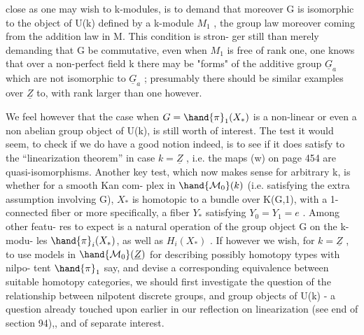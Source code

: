 
close as one may wish to k-modules,  is to demand that moreover G is
isomorphic to the object of U(k) defined by a k-module $M_1$ ,  the group
law moreover coming from the addition law in M.  This condition is stron-%
ger still than merely demanding that G be commutative,  even when $M_1$ is
free of rank one,    one knows that over a non-perfect field k  there
may be "forms" of the additive group $\underline{G}_a$ which are not isomorphic to $\underline{G}_a$ ;
presumably there should be similar examples over $\underline{Z}$ to,  with rank larger
than one however.

We feel however that the case when  $G = \hand{\pi}_1(X_*)$  is a non-linear
or even a non abelian group object of U(k),  is still worth of interest.
The  test it would seem,  to check if we do have a good notion indeed,
is to see if it does satisfy to the ``linearization theorem'' in case $k=\underline{Z}$ ,
i.e. the maps (w) on  page 454 are quasi-isomorphisms.  Another key test,
which now makes sense for arbitrary k,  is whether for a smooth Kan com-%
plex in $\hand{\mathcal{M}_0}(k)$  (i.e. satisfying the extra assumption involving G),
$X_*$  is homotopic to a bundle over K(G,1),  with a 1-connected fiber or
more specifically,  a fiber $Y_*$  satisfying  $Y_0=Y_1=e$ .  Among other featu-%
res to expect is a natural operation of the group object G on the k-modu-%
les $\hand{\pi}_i(X_*)$,  as well as $H_i(X_*)$ .  If however we wish,  for $k=\underline{Z}$ ,  to
use models in $\hand{\mathcal{M}_0}(\underline{Z})$  for describing possibly homotopy types with nilpo-%
tent $\hand{\pi}_1$ say,  and devise a corresponding equivalence between suitable
homotopy categories,  we should first investigate the question of the
relationship between nilpotent discrete groups,  and group objects of
U(k)  -  a question already touched upon earlier in our reflection on
linearization (see end of section 94),, and of separate interest.


